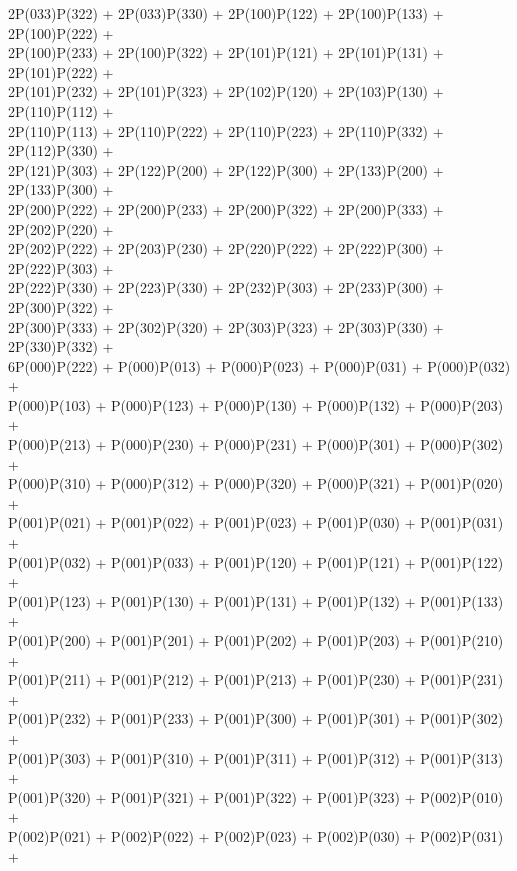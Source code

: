 2P(033)P(322) + 2P(033)P(330) + 2P(100)P(122) + 2P(100)P(133) + 2P(100)P(222) +\\
2P(100)P(233) + 2P(100)P(322) + 2P(101)P(121) + 2P(101)P(131) + 2P(101)P(222) +\\
2P(101)P(232) + 2P(101)P(323) + 2P(102)P(120) + 2P(103)P(130) + 2P(110)P(112) +\\
2P(110)P(113) + 2P(110)P(222) + 2P(110)P(223) + 2P(110)P(332) + 2P(112)P(330) +\\
2P(121)P(303) + 2P(122)P(200) + 2P(122)P(300) + 2P(133)P(200) + 2P(133)P(300) +\\
2P(200)P(222) + 2P(200)P(233) + 2P(200)P(322) + 2P(200)P(333) + 2P(202)P(220) +\\
2P(202)P(222) + 2P(203)P(230) + 2P(220)P(222) + 2P(222)P(300) + 2P(222)P(303) +\\
2P(222)P(330) + 2P(223)P(330) + 2P(232)P(303) + 2P(233)P(300) + 2P(300)P(322) +\\
2P(300)P(333) + 2P(302)P(320) + 2P(303)P(323) + 2P(303)P(330) + 2P(330)P(332) +\\
6P(000)P(222) + P(000)P(013) + P(000)P(023) + P(000)P(031) + P(000)P(032) +\\
P(000)P(103) + P(000)P(123) + P(000)P(130) + P(000)P(132) + P(000)P(203) +\\
P(000)P(213) + P(000)P(230) + P(000)P(231) + P(000)P(301) + P(000)P(302) +\\
P(000)P(310) + P(000)P(312) + P(000)P(320) + P(000)P(321) + P(001)P(020) +\\
P(001)P(021) + P(001)P(022) + P(001)P(023) + P(001)P(030) + P(001)P(031) +\\
P(001)P(032) + P(001)P(033) + P(001)P(120) + P(001)P(121) + P(001)P(122) +\\
P(001)P(123) + P(001)P(130) + P(001)P(131) + P(001)P(132) + P(001)P(133) +\\
P(001)P(200) + P(001)P(201) + P(001)P(202) + P(001)P(203) + P(001)P(210) +\\
P(001)P(211) + P(001)P(212) + P(001)P(213) + P(001)P(230) + P(001)P(231) +\\
P(001)P(232) + P(001)P(233) + P(001)P(300) + P(001)P(301) + P(001)P(302) +\\
P(001)P(303) + P(001)P(310) + P(001)P(311) + P(001)P(312) + P(001)P(313) +\\
P(001)P(320) + P(001)P(321) + P(001)P(322) + P(001)P(323) + P(002)P(010) +\\
P(002)P(021) + P(002)P(022) + P(002)P(023) + P(002)P(030) + P(002)P(031) +\\
